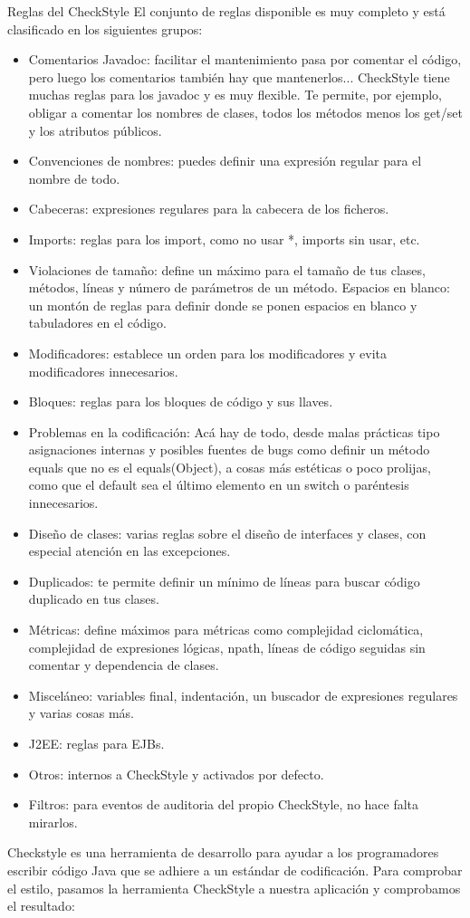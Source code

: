 \documentclass[DIV=calc,paper=a4,fontsize=11pt,onecolumn]{scrartcl} %
\begin{document}
	Reglas del CheckStyle
	El conjunto de reglas disponible es muy completo y está clasificado en los siguientes grupos:
	\begin{itemize}
		\item Comentarios Javadoc: facilitar el mantenimiento pasa por comentar el código, pero luego los comentarios también hay que mantenerlos... CheckStyle tiene muchas reglas para los javadoc y es muy flexible. Te permite, por ejemplo, obligar a comentar los nombres de clases, todos los métodos menos los get/set y los atributos públicos.
		\item Convenciones de nombres: puedes definir una expresión regular para el nombre de todo. 
		\item 	Cabeceras: expresiones regulares para la cabecera de los ficheros.
		\item Imports: reglas para los import, como no usar *, imports sin usar, etc.
		\item Violaciones de tamaño: define un máximo para el tamaño de tus clases, métodos, líneas y número de parámetros de un método.
		Espacios en blanco: un montón de reglas para definir donde se ponen espacios en blanco y tabuladores en el código.
		\item Modificadores: establece un orden para los modificadores y evita modificadores innecesarios.
		\item Bloques: reglas para los bloques de código y sus llaves.
		\item Problemas en la codificación: Acá hay de todo, desde malas prácticas tipo asignaciones internas y posibles fuentes de bugs como definir un método equals que no es el equals(Object), a cosas más estéticas o poco prolijas, como que el default sea el último elemento en un switch o paréntesis innecesarios.
		\item Diseño de clases: varias reglas sobre el diseño de interfaces y clases, con especial atención en las excepciones.
		\item Duplicados: te permite definir un mínimo de líneas para buscar código duplicado en tus clases.
		\item Métricas: define máximos para métricas como complejidad ciclomática, complejidad de expresiones lógicas, npath, líneas de código seguidas sin comentar y dependencia de clases.
		\item Misceláneo: variables final, indentación, un buscador de expresiones regulares y varias cosas más.
		\item J2EE: reglas para EJBs.
		\item Otros: internos a CheckStyle y activados por defecto.
		\item Filtros: para eventos de auditoria del propio CheckStyle, no hace falta mirarlos.
	\end{itemize}	
	Checkstyle es una herramienta de desarrollo para ayudar a los programadores escribir código Java que se adhiere a un estándar de codificación. 
	Para comprobar el estilo, pasamos la herramienta CheckStyle a nuestra aplicación y comprobamos el resultado:
	
\end{document}
